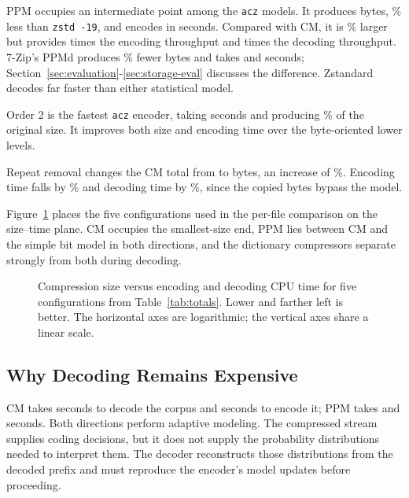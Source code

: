 \documentclass[10pt,letterpaper]{article}
\newcommand{\acz}{\texttt{acz}}
\newcommand{\code}[1]{\texttt{#1}}
\begin{document}
PPM occupies an intermediate point among the \acz{} models. It produces \PpmBytes{} bytes, \PpmSmallerZstd{}\% less than \code{zstd -19}, and encodes in \PpmEncode{} seconds. Compared with CM, it is \PpmLargerCM{}\% larger but provides \PpmCMEncodeRatio{} times the encoding throughput and \PpmCMDecodeRatio{} times the decoding throughput. 7-Zip's PPMd produces \PpmRefSmaller{}\% fewer bytes and takes \PpmRefEncode{} and \PpmRefDecode{} seconds; Section~\ref{sec:evaluation}-\ref{sec:storage-eval} discusses the difference. Zstandard decodes far faster than either statistical model.

Order 2 is the fastest \acz{} encoder, taking \OTwoEncode{} seconds and producing \OTwoFraction\% of the original size. It improves both size and encoding time over the byte-oriented lower levels.

Repeat removal changes the CM total from \CmBytes{} to \DedupBytes{} bytes, an increase of \DedupLarger\%. Encoding time falls by \DedupEncodeLess\% and decoding time by \DedupDecodeLess\%, since the copied bytes bypass the model.

Figure~\ref{fig:costs} places the five configurations used in the per-file comparison on the size--time plane. CM occupies the smallest-size end, PPM lies between CM and the simple bit model in both directions, and the dictionary compressors separate strongly from both during decoding.

\begin{figure}[htbp]
\centering

\caption{Compression size versus encoding and decoding CPU time for five configurations from Table~\ref{tab:totals}. Lower and farther left is better. The horizontal axes are logarithmic; the vertical axes share a linear scale.}\label{fig:costs}
\end{figure}

\subsection{Why Decoding Remains Expensive}
CM takes \CmDecode{} seconds to decode the corpus and \CmEncode{} seconds to encode it; PPM takes \PpmDecode{} and \PpmEncode{} seconds. Both directions perform adaptive modeling. The compressed stream supplies coding decisions, but it does not supply the probability distributions needed to interpret them. The decoder reconstructs those distributions from the decoded prefix and must reproduce the encoder's model updates before proceeding.
\end{document}
